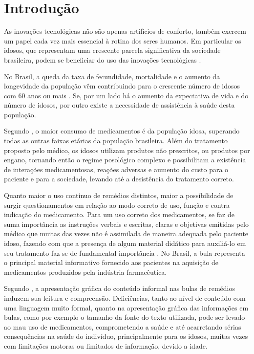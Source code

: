 \chapter{Introdução}\label{ch:intro}

As inovações tecnológicas não são apenas artifícios de conforto, também exercem um papel cada vez mais essencial à rotina dos seres humanos. Em particular os idosos, que representam uma crescente parcela significativa da sociedade brasileira, podem se beneficiar do uso das inovações tecnológicas \cite{Goncalves2011}. 

 No Brasil, a queda da taxa de fecundidade, mortalidade e o aumento da longevidade da população vêm contribuindo para o crescente número de idosos com 60 anos ou mais \cite{IBGE2013}. Se, por um lado há o aumento da expectativa de vida e do número de idosos, por outro existe a necessidade de assistência à saúde desta população.
 
 Segundo , o maior consumo de medicamentos é da população idosa, superando todas as outras faixas etárias da população brasileira. Além do tratamento proposto pelo médico, os idosos utilizam produtos não prescritos, ou produtos por engano, tornando então o regime posológico complexo e possibilitam a existência de interações medicamentosas, reações adversas e aumento do custo para o paciente e para a sociedade, levando até a desistência do tratamento correto.


Quanto maior o uso contínuo de remédios distintos, maior a possibilidade de surgir questionamentos em relação ao modo correto de uso, função e contra indicação do medicamento. Para um uso correto dos medicamentos, se faz de suma importância as instruções verbais e escritas, claras e objetivas  emitidas pelo médico que muitas das vezes não é assimilada de maneira adequada pelo paciente idoso, fazendo com que a presença de algum material didático para auxiliá-lo em seu tratamento faz-se de fundamental importância \cite{Didonet2007}. No Brasil, a bula representa o principal material informativo fornecido aos pacientes na aquisição de medicamentos produzidos pela indústria farmacêutica.

Segundo , a apresentação gráfica do conteúdo informal nas bulas de remédios induzem sua leitura e compreensão. Deficiências, tanto ao nível de conteúdo com uma linguagem muito formal, quanto na apresentação gráfica das informações em bulas, como por exemplo o tamanho da fonte do texto utilizada, pode ser levado ao mau uso de medicamentos, comprometendo a saúde e até acarretando sérias consequências na saúde do indivíduo, principalmente para os idosos, muitas vezes com limitações motoras ou limitados de informação, devido a idade. 


